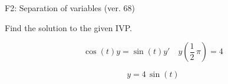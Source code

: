 \begin{exercise}
  \begin{exerciseTitle}F2: Separation of variables (ver. 68)\end{exerciseTitle}
  \begin{exerciseStatement}
    
Find the solution to the given IVP.

    
\[\cos\left(t\right) y= \sin\left(t\right) y'\hspace{1em} y\left( \frac{1}{2} \, \pi \right)= 4\]

  \end{exerciseStatement}
  \begin{exerciseAnswer}
    
\[y= 4 \, \sin\left(t\right)\]

  \end{exerciseAnswer}
\end{exercise}